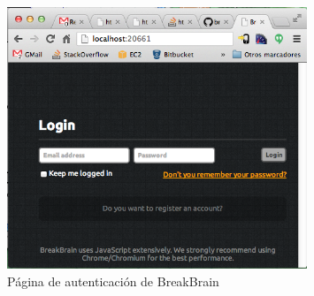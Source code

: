 \begin{enumerate}
\begin{figure}[H]
  \begin{center}
    \includegraphics[width=0.8\textwidth]{images/breakbrain-login.png}
    \caption{Página de autenticación de BreakBrain}
    \label{fig::login}
  \end{center}
\end{figure}

\end{enumerate}
